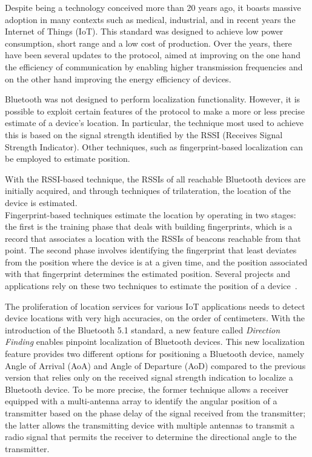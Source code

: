 Despite being a technology conceived more than 20 years ago, it boasts massive adoption in many contexts such as medical, industrial, and in
recent years the Internet of Things (IoT). This standard was designed to achieve low power consumption, short range
and a low cost of production. Over the years, there have been several updates to the protocol, aimed at improving on the one hand the efficiency of
communication by enabling higher transmission frequencies and on the other hand improving the energy efficiency of devices.

Bluetooth was not designed to perform localization functionality. However, it is possible to exploit certain
features of the protocol to make a more or less precise estimate of a device's location. In particular, the technique most
used to achieve this is based on the signal strength identified by the RSSI (Receives Signal Strength Indicator).
Other techniques, such as fingerprint-based localization can be employed to estimate position.

With the RSSI-based technique, the RSSIs of all reachable Bluetooth devices are initially acquired, and through techniques of trilateration, the
location of the device is estimated.\\
Fingerprint-based techniques estimate the location by operating in two stages: the first is the training phase that deals with building fingerprints,
which is a record that associates a location with the RSSIs of beacons reachable from that point.
The second phase involves identifying the fingerprint that least deviates from the position where the device is at a given time, and the
position associated with that fingerprint determines the estimated position. Several projects and applications rely on these two techniques to
estimate the position of a device~\cite{mcconville2021vesta, samuel2021smart}.

The proliferation of location services for various IoT applications needs to detect device locations with very high accuracies, on the order of
centimeters. With the introduction of the Bluetooth 5.1 standard, a new feature called \textit{Direction Finding} enables pinpoint localization
of Bluetooth devices.
This new localization feature provides two different options for positioning a Bluetooth device, namely Angle of Arrival (AoA) and Angle of Departure
(AoD) compared to the previous version that relies only on the received signal strength indication to localize a Bluetooth device.
To be more precise, the former technique allows a receiver equipped with a multi-antenna array to identify the angular position of a transmitter
based on the phase delay of the signal received from the transmitter; the latter allows the transmitting device with multiple antennas to transmit a
radio signal that permits the receiver to determine the directional angle to the transmitter.


